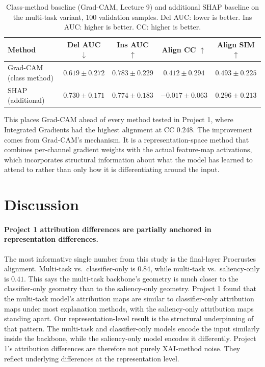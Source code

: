 \documentclass{article}
\begin{document}
\begin{table}[t]
\centering
\caption{Class-method baseline (Grad-CAM, Lecture 9) and additional SHAP baseline on the multi-task variant, 100 validation samples. Del AUC: lower is better. Ins AUC: higher is better. CC: higher is better.}
\label{tab:attribution}
\setlength{\tabcolsep}{4pt}
\small
\begin{tabular}{lcccc}
\toprule
Method & Del AUC $\downarrow$ & Ins AUC $\uparrow$ & Align CC $\uparrow$ & Align SIM $\uparrow$ \\
\midrule
Grad-CAM (class method) & $\mathbf{0.619 \pm 0.272}$ & $\mathbf{0.783 \pm 0.229}$ & $\mathbf{0.412 \pm 0.294}$ & $\mathbf{0.493 \pm 0.225}$ \\
SHAP (additional) & $0.730 \pm 0.171$ & $0.774 \pm 0.183$ & $-0.017 \pm 0.063$ & $0.296 \pm 0.213$ \\
\bottomrule
\end{tabular}
\end{table}

This places Grad-CAM ahead of every method tested in Project 1, where Integrated Gradients had the highest alignment at CC $0.248$. The improvement comes from Grad-CAM's mechanism. It is a representation-space method that combines per-channel gradient weights with the actual feature-map activations, which incorporates structural information about what the model has learned to attend to rather than only how it is differentiating around the input.

\section{Discussion}

\paragraph{Project 1 attribution differences are partially anchored in representation differences.}
The most informative single number from this study is the final-layer Procrustes alignment. Multi-task vs.\ classifier-only is $0.84$, while multi-task vs.\ saliency-only is $0.41$. This says the multi-task backbone's geometry is much closer to the classifier-only geometry than to the saliency-only geometry. Project 1 found that the multi-task model's attribution maps are similar to classifier-only attribution maps under most explanation methods, with the saliency-only attribution maps standing apart. Our representation-level result is the structural underpinning of that pattern. The multi-task and classifier-only models encode the input similarly inside the backbone, while the saliency-only model encodes it differently. Project 1's attribution differences are therefore not purely XAI-method noise. They reflect underlying differences at the representation level.
\end{document}
